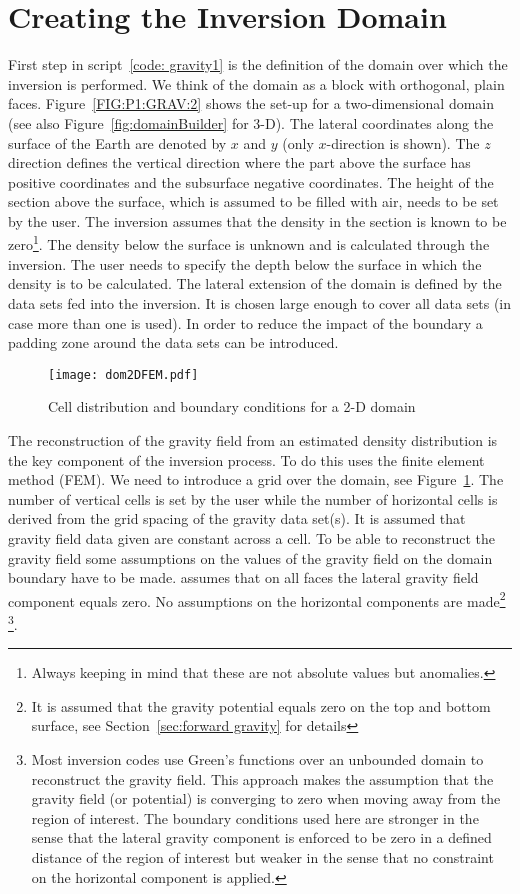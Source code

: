 \section{Creating the Inversion Domain}
First step in script~\ref{code: gravity1} is the definition of the domain over
which the inversion is performed.
We think of the domain as a block with orthogonal, plain faces.
Figure~\ref{FIG:P1:GRAV:2} shows the set-up for a two-dimensional domain
(see also Figure~\ref{fig:domainBuilder} for 3-D).
The lateral coordinates along the surface of the Earth are denoted by $x$ and
$y$ (only $x$-direction is shown).
The $z$ direction defines the vertical direction where the part above the
surface has positive coordinates and the subsurface negative coordinates.
The height of the section above the surface, which is assumed to be filled
with air, needs to be set by the user.
The inversion assumes that the density in the section is known to be
zero\footnote{Always keeping in mind that these are not absolute values but
anomalies.}.
The density below the surface is unknown and is calculated through the
inversion. The user needs to specify the depth below the surface in which the
density is to be calculated.
The lateral extension of the domain is defined by the data sets fed into the
inversion.
It is chosen large enough to cover all data sets (in case more than one is
used). In order to reduce the impact of the boundary a padding zone around the
data sets can be introduced.

\begin{figure}
\centering
\texttt{[image: dom2DFEM.pdf]}
\caption{Cell distribution and boundary conditions for a 2-D domain}
\label{FIG:P1:GRAV:3}
\end{figure}

The reconstruction of the gravity field from an estimated density distribution
is the key component of the inversion process.
To do this \downunder uses the finite element method (FEM).
We need to introduce a grid over the domain, see Figure~\ref{FIG:P1:GRAV:3}.
The number of vertical cells is set by the user while the number of horizontal
cells is derived from the grid spacing of the gravity data set(s).
It is assumed that gravity field data given are constant across a cell.
To be able to reconstruct the gravity field some assumptions on the values of
the gravity field on the domain boundary have to be made.
\downunder assumes that on all faces the lateral gravity field component
equals zero. No assumptions on the horizontal components are
made\footnote{It is assumed that the gravity potential equals zero on the top
and bottom surface, see Section~\ref{sec:forward gravity} for details}%
\footnote{Most inversion codes use Green's functions over an unbounded domain
to reconstruct the gravity field. This approach makes the assumption that the
gravity field (or potential) is converging to zero when moving away from the
region of interest. The boundary conditions used here are stronger in the
sense that the lateral gravity component is enforced to be zero in a defined
distance of the region of interest but weaker in the sense that no constraint
on the horizontal component is applied.}.
   
